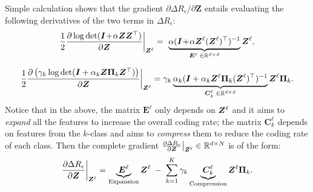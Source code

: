 \documentclass[../../book-main.tex]{subfiles}
\begin{document}

Simple calculation shows that the gradient ${\partial \Delta R_{\epsilon}}/{\partial \bm Z}$ entails evaluating the following derivatives of the two terms in $\Delta R_{\epsilon}$:
\begin{equation}\label{eqn:expand-directions}
    \frac{1}{2}\frac{\partial \log \det (\bm{I} \!+\! \alpha \bm{Z} \bm{Z}^{\top} )}{\partial \bm Z}\bigg|_{\bm{Z}^\ell} = \,\, \underbrace{\alpha(\bm{I} \!+\! \alpha\bm{Z}^\ell (\bm{Z}^\ell)^\top)^{-1}}_{\bm E^{\ell} \; \in \mathbb{R}^{d\times d}}\bm{Z}^\ell,
\end{equation}

\begin{equation}\label{eqn:compress-directions}
\frac{1}{2}\frac{\partial \left( \gamma_{k}  \log \det (\bm{I} + \alpha_{k} \bm{Z} \bm \Pi_k \bm{Z}^{\top} )  \right)}{\partial \bm Z}\bigg|_{\bm{Z}^\ell} \\= \gamma_{k}  \underbrace{ \alpha_{k}  (\bm{I} +  \alpha_{k} \bm{Z}^\ell \bm \Pi_k (\bm{Z}^\ell)^{\top})^{-1}}_{\bm C^{\ell}_k \; \in \mathbb{R}^{d\times d}} \bm{Z}^{\ell} \bm \Pi_k.
\end{equation}
Notice that in the above, the matrix $\bm E^{\ell}$  only depends on $\bm{Z}^{\ell}$ and it aims to {\em expand} all the features to increase the overall coding rate; the matrix $\bm C^{\ell}_{k}$ depends on features from the $k$-class and aims to {\em compress} them to reduce the coding rate of each class. 
Then the complete gradient $\frac{\partial \Delta R_{\epsilon}}{\partial \bm Z}\big|_{\bm{Z}^\ell} \in \mathbb{R}^{d\times N}$ is of the  form:
\begin{equation}
\frac{\partial \Delta R_{\epsilon}}{\partial \bm Z}\bigg|_{\bm{Z}^\ell}  = \underbrace{\bm E^{\ell}}_{\text{Expansion}} \bm{Z}^{\ell} \;-\; \sum_{k=1}^K \gamma_{k} \underbrace{\bm C_{k}^{\ell}}_{\text{Compression}}  \bm{Z}^{\ell} \bm{\Pi}_k.
\label{eqn:DR-gradient}
\end{equation}
\end{document}
